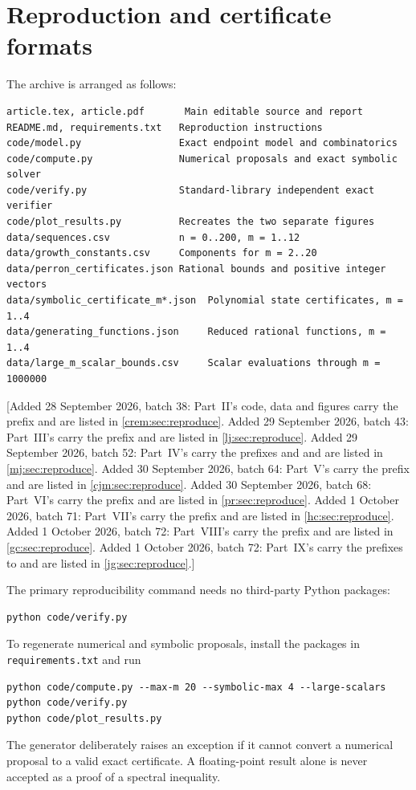 \documentclass[11pt,a4paper]{article}
\theoremstyle{definition}\newaliascnt{definition}{theorem}
\theoremstyle{remark}\newaliascnt{remark}{theorem}
\begin{document}
\section{Reproduction and certificate formats}
\label{app:reproduction}
The archive is arranged as follows:
\begin{lstlisting}
article.tex, article.pdf       Main editable source and report
README.md, requirements.txt   Reproduction instructions
code/model.py                 Exact endpoint model and combinatorics
code/compute.py               Numerical proposals and exact symbolic solver
code/verify.py                Standard-library independent exact verifier
code/plot_results.py          Recreates the two separate figures
data/sequences.csv            n = 0..200, m = 1..12
data/growth_constants.csv     Components for m = 2..20
data/perron_certificates.json Rational bounds and positive integer vectors
data/symbolic_certificate_m*.json  Polynomial state certificates, m = 1..4
data/generating_functions.json     Reduced rational functions, m = 1..4
data/large_m_scalar_bounds.csv     Scalar evaluations through m = 1000000
\end{lstlisting}
[Added 28 September 2026, batch 38: Part~II's code, data and figures carry
the prefix  and are listed in
\cref{crem:sec:reproduce}.
Added 29 September 2026, batch 43: Part~III's carry the prefix
 and are listed in \cref{lj:sec:reproduce}.
Added 29 September 2026, batch 52: Part~IV's carry the prefixes
 and  and are
listed in \cref{mj:sec:reproduce}.
Added 30 September 2026, batch 64: Part~V's carry the prefix
 and are listed in \cref{cjm:sec:reproduce}.
Added 30 September 2026, batch 68: Part~VI's carry the prefix
 and are listed in \cref{pr:sec:reproduce}.
Added 1 October 2026, batch 71: Part~VII's carry the prefix
 and are listed in \cref{hc:sec:reproduce}.
Added 1 October 2026, batch 72: Part~VIII's carry the prefix
 and are listed in \cref{gc:sec:reproduce}.
Added 1 October 2026, batch 72: Part~IX's carry the prefixes
 to  and are
listed in \cref{jg:sec:reproduce}.]

The primary reproducibility command needs no third-party Python packages:
\begin{lstlisting}
python code/verify.py
\end{lstlisting}
To regenerate numerical and symbolic proposals, install the packages in
\texttt{requirements.txt} and run
\begin{lstlisting}
python code/compute.py --max-m 20 --symbolic-max 4 --large-scalars
python code/verify.py
python code/plot_results.py
\end{lstlisting}
The generator deliberately raises an exception if it cannot convert a
numerical proposal to a valid exact certificate. A floating-point result
alone is never accepted as a proof of a spectral inequality.
\end{document}
